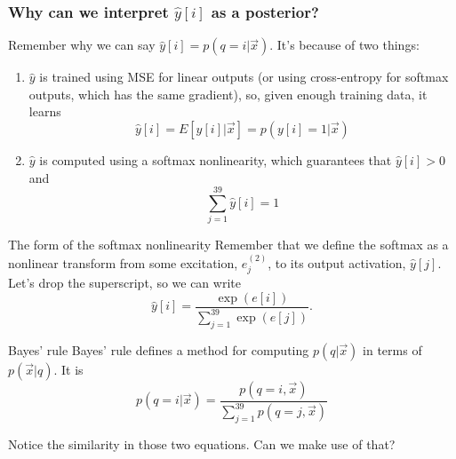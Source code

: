 \documentclass{beamer}
\begin{document}
\begin{frame}
  \frametitle{Why can we interpret  $\hat{y}[i]$ as a posterior?}

  Remember why we can say $\hat{y}[i]=p\left(q=i|\vec{x}\right)$.
  It's because of two things:
  \begin{enumerate}
    \item $\hat{y}$ is trained using MSE for linear outputs (or using
      cross-entropy for softmax outputs, which has the same gradient),
      so, given enough training data, it learns
      \begin{displaymath}
        \hat{y}[i] = E\left[y[i]|\vec{x}\right] = p\left(y[i]=1|\vec{x}\right)
      \end{displaymath}
    \item $\hat{y}$ is computed using a softmax nonlinearity, which
      guarantees that $\hat{y}[i]>0$ and
      \begin{displaymath}
        \sum_{j=1}^{39} \hat{y}[i]=1
      \end{displaymath}
  \end{enumerate}
\end{frame}

\begin{frame}
  \begin{block}{The form of the softmax nonlinearity}
  Remember that we define the softmax as a nonlinear transform from
  some excitation, $e^{(2)}_j$, to its output activation,
  $\hat{y}[j]$.  Let's drop the superscript, so we can write
  \begin{displaymath}
    \hat{y}[i] = \frac{\exp(e[i])}{\sum_{j=1}^{39} \exp(e[j])}.
  \end{displaymath}
  \end{block}

  \begin{block}{Bayes' rule}
    Bayes' rule defines a method for computing $p(q|\vec{x})$ in terms
    of $p(\vec{x}|q)$.  It is
    \begin{displaymath}
      p(q=i|\vec{x}) = \frac{p(q=i,\vec{x})}{\sum_{j=1}^{39} p(q=j,\vec{x})}
    \end{displaymath}
  \end{block}
  Notice the similarity in those two equations.  Can we make use of that?
\end{frame}
\end{document}
